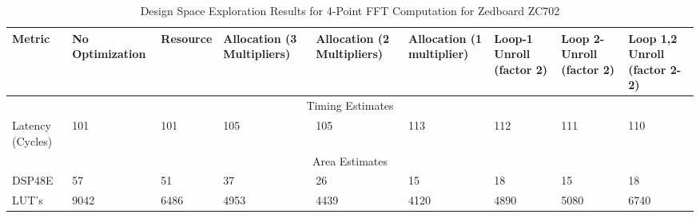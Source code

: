 \begin{table}[H]
\centering
\caption{ Design Space Exploration Results for 4-Point FFT Computation for Zedboard ZC702}
\label{4-point}
\begin{tabular}{||m{1.5cm}|m{1.5cm}|m{1.5cm}|m{1.6cm}|m{1.6cm}|m{1.6cm}|m{1.4cm}|m{1.4cm}|m{1.4cm}||}
\hline
Metric & No Optimization & Resource & Allocation (3 Multipliers) & Allocation (2 Multipliers) & Allocation (1 multiplier) & Loop-1 Unroll (factor 2) & Loop 2-Unroll (factor 2) & Loop 1,2 Unroll (factor 2-2) \\
\hline
\multicolumn{9}{||c||}{Timing Estimates}\\
\hline
Latency (Cycles) & 101 & 101 & 105 & 105 & 113  & 112 & 111 & 110\\
\hline
\multicolumn{9}{||c||}{Area Estimates}\\
\hline
DSP48E  & 57 & 51 & 37 & 26 & 15 & 18 & 15 & 18\\
\hline
LUT's  &9042 & 6486 & 4953 & 4439 & 4120 &4890 & 5080 & 6740 \\
\hline
\end{tabular}

\end{table}

